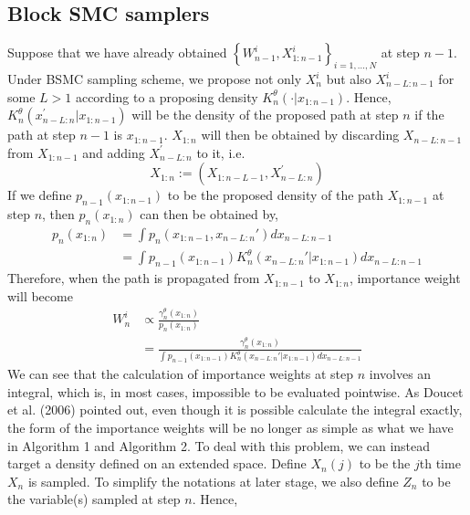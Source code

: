 \documentclass[12pt,a4paper]{article}
\begin{document}
\subsection{Block SMC samplers}
Suppose that we have already obtained $\left\{W_{n-1}^i,X_{1:n-1}^i\right\}_{i = 1,...,N}$ at step $n-1$. Under BSMC sampling scheme, we propose not only $X_n^i$ but also $X_{n-L:n-1}^i$ for some $L>1$ according to a proposing density $K_n^{\theta}(\cdot|x_{1:n-1})$. Hence, $K_n^{\theta}(x_{n-L:n}^{'}|x_{1:n-1})$ will be the density of the proposed path at step $n$ if the path at step $n-1$ is $x_{1:n-1}$. $X_{1:n}$ will then be obtained by discarding $X_{n-L:n-1}$ from $X_{1:n-1}$ and adding $X_{n-L:n}^{'}$ to it, i.e. 
\begin{equation}\label{eqn:BlockSMC Propogate}
    X_{1:n}:= (X_{1:n-L-1},X_{n-L:n}^{'})
\end{equation}
If we define $p_{n-1}(x_{1:n-1})$ to be the proposed density of the path $X_{1:n-1}$ at step $n$, then $p_n(x_{1:n})$ can then be obtained by,
\begin{equation*}
    \begin{split}
        p_n(x_{1:n}) &= \int p_n(x_{1:n-1},x_{n-L:n}') dx_{n-L:n-1}\\
        &= \int p_{n-1}(x_{1:n-1}) K_n^{\theta}(x_{n-L:n}'|x_{1:n-1}) dx_{n-L:n-1}
    \end{split}
\end{equation*}
Therefore, when the path is propagated from $X_{1:n-1}$ to $X_{1:n}$, importance weight will become
\begin{equation*}
    \begin{split}
        W_n^i &\propto \frac{\gamma_n^{\theta}(x_{1:n})}{p_n(x_{1:n})}\\
        &= \frac{\gamma_n^{\theta}(x_{1:n})}{\int p_{n-1}(x_{1:n-1}) K_n^{\theta}(x_{n-L:n}'|x_{1:n-1}) dx_{n-L:n-1}}
    \end{split}
\end{equation*}
We can see that the calculation of importance weights at step $n$ involves an integral, which is, in most cases, impossible to be evaluated pointwise. As Doucet et al. (2006) pointed out, even though it is possible calculate the integral exactly, the form of the importance weights will be no longer as simple as what we have in Algorithm 1 and Algorithm 2. 
\newline
\newline
To deal with this problem, we can instead target a density defined on an extended space. Define $X_n(j)$ to be the $j$th time $X_n$ is sampled. To simplify the notations at later stage, we also define $Z_n$ to be the variable(s) sampled at step $n$. Hence,
\end{document}
